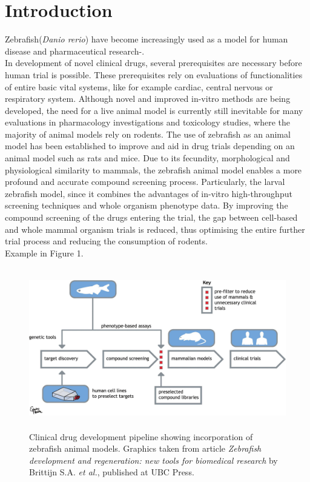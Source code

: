 \documentclass[a4paper,12pt]{article}
\begin{document}
\section{Introduction}
Zebrafish(\textit{Danio rerio}) have become increasingly used as a model for human disease and pharmaceutical research\cite{ref1}-\cite{ref3}. 
\\In development of novel
clinical drugs, several prerequisites are necessary before human trial is possible. These prerequisites rely on evaluations of functionalities of entire basic
vital systems, like for example cardiac, central nervous or respiratory system\cite{ref4}.
Although novel and improved in-vitro methods are being developed, the need for a live animal model is currently still inevitable for many evaluations in pharmacology investigations and toxicology studies, where the majority of animal models rely on rodents. The use of zebrafish as an animal model has been established to improve and aid in drug trials depending on an animal model such as rats and mice.
Due to its fecundity, morphological and physiological similarity to mammals, the zebrafish animal model enables a more profound and accurate compound screening process. 
Particularly, the larval zebrafish model, since it combines the advantages of in-vitro high-throughput screening techniques and whole organism phenotype data. By improving the compound screening of
the drugs entering the trial, the gap between cell-based and whole mammal organism trials is reduced, thus optimising the entire further trial process and reducing the consumption
of rodents\cite{ref1}. \\Example in Figure 1.
\begin{figure}[h]
\begin{center}
\includegraphics[width=15cm,height=7cm]{drug_trial_example.jpg}
\caption{Clinical drug development pipeline showing incorporation of zebrafish animal models. Graphics taken from article \textit{Zebrafish development and regeneration:
new tools for biomedical research} by Brittijn S.A. \textit{et al.}, published at  UBC Press\cite{ref1}. }
\end{center}
\end{figure}
\end{document}
